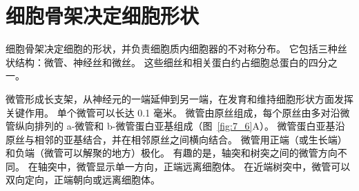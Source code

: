 \section{细胞骨架决定细胞形状}

细胞骨架决定细胞的形状，并负责细胞质内细胞器的不对称分布。
它包括三种丝状结构：微管、神经丝和微丝。 
这些细丝和相关蛋白约占细胞总蛋白的四分之一。


微管形成长支架，从神经元的一端延伸到另一端，在发育和维持细胞形状方面发挥关键作用。
单个微管可以长达 0.1 毫米。
微管由原丝组成，每个原丝由多对沿微管纵向排列的 a-微管和 b-微管蛋白亚基组成（图~\ref{fig:7_6}A）。 
微管蛋白亚基沿原丝与相邻的亚基结合，并在相邻原丝之间横向结合。
微管用正端（或生长端）和负端（微管可以解聚的地方）极化。
有趣的是，轴突和树突之间的微管方向不同。
在轴突中，微管显示单一方向，正端远离细胞体。
在近端树突中，微管可以双向定向，正端朝向或远离细胞体。


